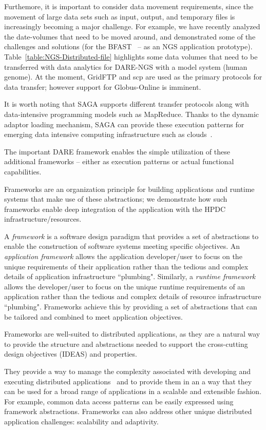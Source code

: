 \documentclass[]{svjour3}
\begin{document}
Furthemore, it is important to consider data movement requirements,
since the movement of large data sets such as input, output, and
temporary files is increasingly becoming a major challenge.  For
example, we have recently analyzed the date-volumes that need to be
moved around, and demonstrated some of the challenges and solutions
(for the BFAST~\cite{ecmls11} -- as an NGS application prototype).
Table~\ref{table:NGS-Distributed-file} highlights some data volumes
that need to be transferred with data analytics for DARE-NGS with a
model system (human genome).  At the moment, GridFTP and scp are used
as the primary protocols for data transfer; however support for
Globus-Online is imminent.

It is worth noting that SAGA supports different transfer protocols
along with data-intensive programming models such as MapReduce.
Thanks to the dynamic adaptor loading mechanism, SAGA can provide
these execution patterns for emerging data intensive computing
infrastructure such as clouds~\cite{abstractions-azure,saga-ccgrid10}.

The important DARE framework enables the simple utilization of these
additional frameworks -- either as execution patterns or actual
functional capabilities.


Frameworks are an organization principle for building applications and
runtime systems that make use of these abstractions; we demonstrate
how such frameworks enable deep integration of the application with
the HPDC infrastructure/resources.

A {\em framework} is a software design paradigm that provides a set of
abstractions to enable the construction of software systems meeting
specific objectives. An {\em application framework} allows the
application developer/user to focus on the unique requirements of
their application rather than the tedious and complex details of
application infrastructure ``plumbing". Similarly, a {\em runtime
  framework} allows the developer/user to focus on the unique runtime
requirements of an application rather than the tedious and complex
details of resource infrastructure ``plumbing". Frameworks achieve
this by providing a set of abstractions that can be tailored and
combined to meet application objectives.

Frameworks are well-suited to distributed applications, as they are a
natural way to provide the structure and abstractions needed to
support the cross-cutting design objectives (IDEAS) and properties.

They provide a way to manage the complexity associated with developing
and executing distributed applications~\cite{dpa-surveypaper} and to provide
them in an a way that they can be used for a broad range of
applications in a scalable and extensible fashion. For example, common
data access patterns can be easily expressed using framework
abstractions.  Frameworks can also address other unique distributed
application challenges: scalability and adaptivity.
\end{document}
